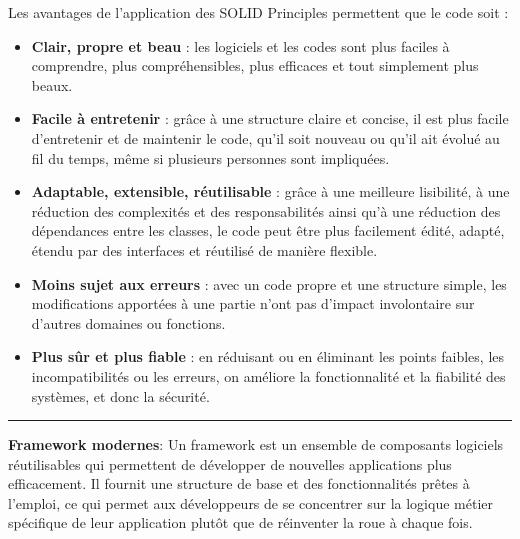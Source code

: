 Les avantages de l’application des SOLID Principles permettent que le code soit :
\begin{itemize}
	\item \textbf{Clair, propre et beau} : les logiciels et les codes sont plus faciles à comprendre, plus compréhensibles, plus efficaces et tout simplement plus beaux.
	\item \textbf{Facile à entretenir} : grâce à une structure claire et concise, il est plus facile d’entretenir et de maintenir le code, qu’il soit nouveau ou qu’il ait évolué au fil du temps, même si plusieurs personnes sont impliquées.
	\item \textbf{Adaptable, extensible, réutilisable} : grâce à une meilleure lisibilité, à une réduction des complexités et des responsabilités ainsi qu’à une réduction des dépendances entre les classes, le code peut être plus facilement édité, adapté, étendu par des interfaces et réutilisé de manière flexible.
	\item \textbf{Moins sujet aux erreurs} : avec un code propre et une structure simple, les modifications apportées à une partie n’ont pas d’impact involontaire sur d’autres domaines ou fonctions.
	\item \textbf{Plus sûr et plus fiable} : en réduisant ou en éliminant les points faibles, les incompatibilités ou les erreurs, on améliore la fonctionnalité et la fiabilité des systèmes, et donc la sécurité.
\end{itemize}

\begin{center}
\rule{5cm}{0.4pt}
\end{center}

\vspace{0.5cm}

\noindent \textbf{Framework modernes}:
\noindent  Un framework est un ensemble de composants logiciels réutilisables qui permettent de développer de nouvelles applications plus efficacement. Il fournit une structure de base et des fonctionnalités prêtes à l'emploi, ce qui permet aux développeurs de se concentrer sur la logique métier spécifique de leur application plutôt que de réinventer la roue à chaque fois.	

